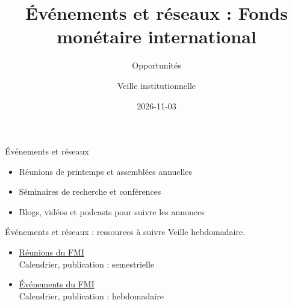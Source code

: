 \documentclass[aspectratio=169,11pt]{beamer}
\title{Événements et réseaux : Fonds monétaire international}
\subtitle{Opportunités}
\author{Veille institutionnelle}
\date{2026-11-03}
\begin{document}
\begin{frame}\titlepage\end{frame}

\begin{frame}{Événements et réseaux}
\begin{itemize}
\item Réunions de printemps et assemblées annuelles
\item Séminaires de recherche et conférences
\item Blogs, vidéos et podcasts pour suivre les annonces
\end{itemize}
\end{frame}

\begin{frame}{Événements et réseaux : ressources à suivre}
\small
Veille hebdomadaire.
\begin{itemize}
\item \href{https://www.imf.org/en/Meetings}{Réunions du FMI}\\{\footnotesize Calendrier, publication : semestrielle}
\item \href{https://www.imf.org/en/Events}{Événements du FMI}\\{\footnotesize Calendrier, publication : hebdomadaire}
\end{itemize}
\end{frame}
\end{document}
